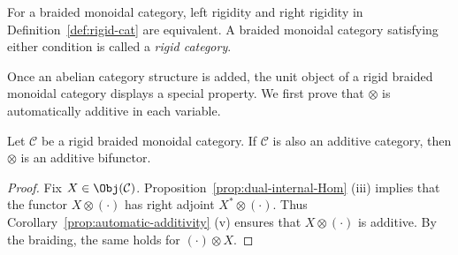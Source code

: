\begin{definition}\label{def:rigid-cat-braided}
	For a braided monoidal category, left rigidity and right rigidity in
	Definition~\ref{def:rigid-cat} are equivalent. A braided monoidal category
	satisfying either condition is called a \emph{rigid category}.
\end{definition}

Once an abelian category structure is added, the unit object of a rigid
braided monoidal category displays a special property. We first prove that
$\otimes$ is automatically additive in each variable.

\begin{proposition}\label{prop:rigid-additive}
	Let $\mathcal{C}$ be a rigid braided monoidal category. If $\mathcal{C}$ is
	also an additive category, then $\otimes$ is an additive bifunctor.
\end{proposition}
\begin{proof}
	Fix $X\in\Obj(\mathcal{C})$. Proposition~\ref{prop:dual-internal-Hom}
	(iii) implies that the functor $X\otimes(\cdot)$ has right adjoint
$X^*\otimes(\cdot)$. Thus Corollary~\ref{prop:automatic-additivity} (v)
ensures that $X\otimes(\cdot)$ is additive. By the braiding, the same holds
for $(\cdot)\otimes X$.
\end{proof}


